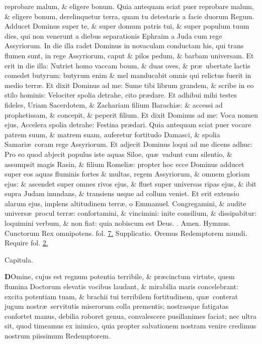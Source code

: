 \documentclass[letter,11pt]{book}
\makeatletter
\DeclareRobustCommand{\Rbar}{\vers@resp{0pt}{R}}
\newcommand{\vers@resp@sym}{\raisebox{0.2ex}{\rotatebox[origin=c]{-20}{$\m@th\rceil$}}}
\newcommand{\vers@resp}[2]{%
  {\ooalign{\hidewidth\kern#1\vers@resp@sym\hidewidth\cr#2\cr}}%
}%
\def\R{\color{Red} \Rbar . \color{black}}
\makeatother
\begin{document}
\begin{multicols}{2}
reprobare malum, \& eligere bonum. Quia antequam sciat puer reprobare malum, \& eligere bonum, derelinquetur terra, quam tu detestaris a facie duorum Regum. Adducet Dominus super te, \& super domum patris tui, \& super populum tuum dies, qui non venerunt a diebus separationis Ephraim a Juda cum rege Assyriorum. In die illa radet Dominus in novaculam conductam his, qui trans flumen sunt, in rege Assyriorum, caput \& pilos pedum, \& barbam universam. Et erit in die illa: Nutriet homo vaccam boum, \& duas oves, \& pr\ae \ ubertate lactis comedet butyrum: butyrum enim \& mel manducabit omnis qui relictus fuerit in medio terr\ae . Et dixit Dominus ad me: Sume tibi librum grandem, \& scribe in eo stilo hominis: Velociter spolia detrahe, cito pr\ae dare. Et adhibui mihi testes fideles, Uriam Sacerdotem, \& Zachariam filium Barachi\ae : \& accessi ad prophetissam, \& concepit, \& peperit filium. Et dixit Dominus ad me: Voca nomen ejus, Accelera spolia detrahe: Festina pr\ae dari. Quia antequam sciat puer vocare patrem suum, \& matrem suam, auferetur fortitudo Damasci, \& spolia Samari\ae \ coram rege Assyriorum. Et adjecit Dominus loqui ad me dicens adhuc: Pro eo quod abjecit populus iste aquas Siloe, qu\ae \ vadunt cum silentio, \& assumpsit magis Rasin, \& filium Romeli\ae : propter hoc ecce Dominus adducet super eos aquas fluminis fortes \& multas, regem Assyriorum, \& omnem gloriam ejus: \& ascendet super omnes rivos ejus, \& fluet super universas ripas ejus, \& ibit supra Judam inundans, \& transiens usque ad collum veniet. Et erit extensio alarum ejus, implens altitudinem terr\ae , o Emmanuel. Congregamini, \& audite univers\ae \ procul terr\ae : confortamini, \& vincimini: inite consilium, \& dissipabitur: loquimini verbum, \& non fiat: quia nobiscum est Deus. \R Amen.
\newline \color{Red} Hymnus. \color{black} Cunctorum Rex omnipotens. \color{Red} fol. \color{black} \hyperlink{page.7}{7.}
\newline \color{Red} Supplicatio. \color{black} Oremus Redemptorem mundi. \color{Red} Require fol. \color{black} \hyperlink{page.2}{2.}
\vspace{-.5em} \begin{center} \color{Red} Capitula. \color{black} \end{center} \vspace{-.5em}
\lettrine[lines=2]{\bfseries \color{Red} D}{}Omine, cujus est regnum potentia terribile, \& pr\ae cinctum virtute, quem flumina Doctorum elevatis vocibus laudant, \& mirabilia maris concelebrant: excita potentiam tuam, \& brachii tui terribilem fortitudinem, qu\ae \ conterat jugum nostr\ae \ servitutis miserorum colla prementis; nostrasque fatigatas confortet manus, debilia roboret genua, convalescere pusillanimes faciat; nec ultra sit, quod timeamus ex inimico, quia propter salvationem nostram venire credimus nostrum piissimum Redemptorem.

\end{multicols}
\end{document}
